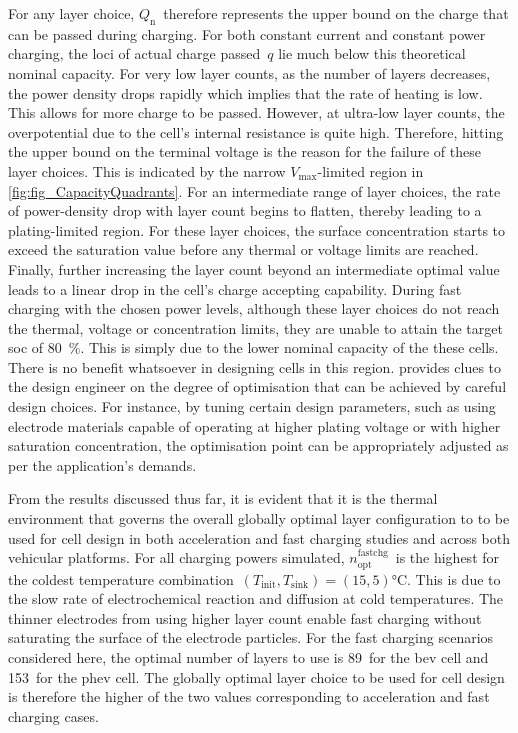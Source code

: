 For any layer  choice, $Q_\text{n}$~therefore represents the upper  bound on the
charge  that can  be  passed  during charging.  For  both  constant current  and
constant power  charging, the loci of  actual charge passed~$q$ lie  much below
this theoretical nominal  capacity. For very low layer counts,  as the number of
layers decreases, the power density drops rapidly which implies that the rate of
heating is low. This allows for more  charge to be passed. However, at ultra-low
layer counts, the  overpotential due to the cell's internal  resistance is quite
high.  Therefore,  hitting the  upper  bound  on  the  terminal voltage  is  the
reason  for  the failure  of  these  layer choices.  This  is  indicated by  the
narrow \mbox{$V_\text{max}$-limited} region in \cref{fig:fig_CapacityQuadrants}.
For an intermediate range of  layer choices, the rate of power-density  drop
with layer count begins to flatten, thereby leading  to a plating-limited
region. For these layer choices, the  surface concentration starts to exceed 
the saturation value before any  thermal or voltage  limits are reached.
Finally,  further increasing the layer count beyond  an intermediate optimal
value leads to  a linear drop in the cell's  charge accepting  capability.
During fast  charging with  the chosen power levels, although these layer
choices  do not reach the thermal, voltage or concentration  limits,  they  are 
unable  to attain  the  target  \gls{soc}  of \SI{80}{\percent}. This is simply
due to the lower nominal capacity of the these cells.  There is  no  benefit 
whatsoever in  designing  cells  in this  region.
 provides  clues to  the design engineer  on the
degree  of optimisation  that can  be achieved  by careful  design choices.  For
instance, by tuning certain design parameters, such as using electrode materials
capable  of  operating at  higher  plating  voltage  or with  higher  saturation
concentration, the optimisation  point can be appropriately adjusted  as per the
application's demands.


From  the results  discussed thus  far, it  is evident  that it  is the  thermal
environment  that  governs   the  overall globally optimal  layer configuration 
to to be used for cell design in  both acceleration and fast charging studies
and across both vehicular platforms. For all charging powers simulated,
$n^\text{fastchg}_\text{opt}$~is the highest for the coldest temperature 
combination~${(T_\text{init},T_\text{sink}) =  (15, 5) \si{\degreeCelsius}}$.
This is due to  the slow rate of electrochemical reaction and diffusion  at cold
temperatures. The thinner  electrodes from  using higher layer count enable
fast charging without saturating the surface of the electrode particles. For the
fast charging scenarios considered here,  the optimal number of layers to use 
is 89~for the \gls{bev} cell and  153~for the \gls{phev} cell. The globally
optimal  layer choice to be  used for cell design  is therefore the higher of
the two values corresponding  to acceleration and fast charging cases.

